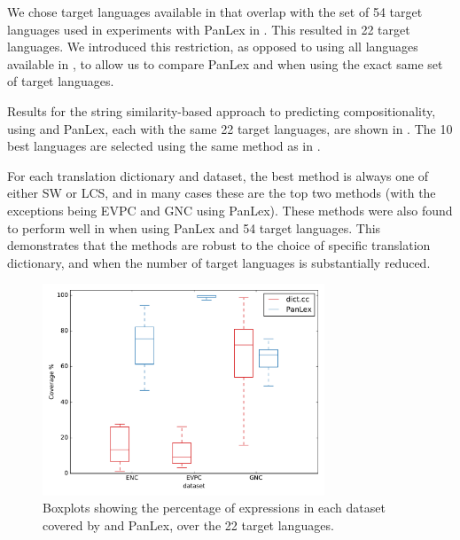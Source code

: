 \documentclass[output=paper,modfonts,nonflat]{langsci/langscibook}
\begin{document}
We chose target languages available in \dictcc that overlap with the
set of 54 target languages used in experiments with PanLex in
. This resulted in 22 target
languages. We introduced this restriction, as opposed to using all
languages available in \dictcc, to allow us to compare PanLex and
\dictcc when using the exact same set of target languages.


Results for the string similarity-based approach to predicting
compositionality, using \dictcc and PanLex, each with the same 22
target languages, are shown in
. The 10 best languages are
selected using the same method as in .




For each translation dictionary and dataset, the best method is always
one of either SW or LCS, and in many cases these are the top two
methods (with the exceptions being EVPC and GNC using PanLex). These
methods were also found to perform well in 
when using PanLex and 54 target languages. This demonstrates that the 
methods are robust to the choice of specific translation dictionary,
and when the number of target languages is substantially reduced.

\begin{figure}[t]

  \includegraphics[width=0.75\textwidth]{figures/coverage-boxplot.pdf}
\caption{Boxplots showing the percentage of expressions in each
  dataset covered by \dictcc and PanLex, over the 22 target
  languages.\label{fig:ccdict:coverage}}

\end{figure}
\end{document}
